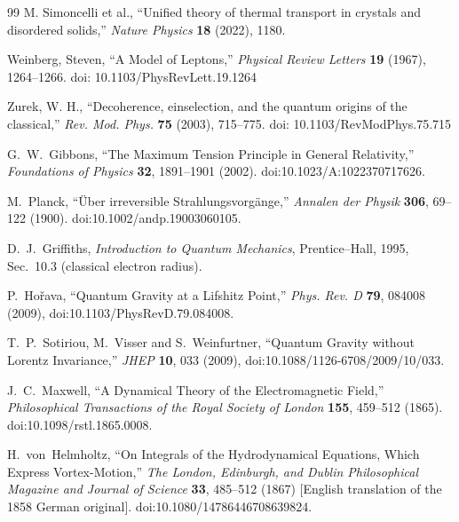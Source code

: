 \documentclass[10pt,reprint,aps,onecolumn,nofootinbib]{revtex4-2}
\begin{document}
\begin{thebibliography}{99}
    M. Simoncelli et al.,
    ``Unified theory of thermal transport in crystals and disordered solids,''
    \textit{Nature Physics}
    \textbf{18}
    (2022), 1180.

    Weinberg, Steven,
    ``A Model of Leptons,''
    \textit{Physical Review Letters}
    \textbf{19}
    (1967), 1264--1266.
    doi: 10.1103/PhysRevLett.19.1264

    Zurek, W. H.,
    ``Decoherence, einselection, and the quantum origins of the classical,''
    \textit{Rev. Mod. Phys.}
    \textbf{75}
    (2003), 715--775.
    doi: 10.1103/RevModPhys.75.715

    G.~W.~Gibbons,
    ``The Maximum Tension Principle in General Relativity,''
    \emph{Foundations of Physics} \textbf{32}, 1891--1901 (2002).
    doi:10.1023/A:1022370717626.

    M.~Planck,
    ``\"Uber irreversible Strahlungsvorg\"ange,''
    \emph{Annalen der Physik} \textbf{306}, 69--122 (1900).
    doi:10.1002/andp.19003060105.

    D.~J.~Griffiths,
    \emph{Introduction to Quantum Mechanics},
    Prentice--Hall, 1995, Sec.~10.3 (classical electron radius).

    P.~Hořava,
    ``Quantum Gravity at a Lifshitz Point,''
    \emph{Phys. Rev. D} \textbf{79}, 084008 (2009),
    doi:10.1103/PhysRevD.79.084008.

    T.~P.~Sotiriou, M.~Visser and S.~Weinfurtner,
    ``Quantum Gravity without Lorentz Invariance,''
    \emph{JHEP} \textbf{10}, 033 (2009),
    doi:10.1088/1126-6708/2009/10/033.

        J.~C.~Maxwell,
        ``A Dynamical Theory of the Electromagnetic Field,''
        \textit{Philosophical Transactions of the Royal Society of London} \textbf{155}, 459--512 (1865).
        doi:10.1098/rstl.1865.0008.

        H.~von~Helmholtz,
        ``On Integrals of the Hydrodynamical Equations, Which Express Vortex-Motion,''
        \textit{The London, Edinburgh, and Dublin Philosophical Magazine and Journal of Science} \textbf{33}, 485--512 (1867)
        [English translation of the 1858 German original].
        doi:10.1080/14786446708639824.


\end{thebibliography}
\end{document}
